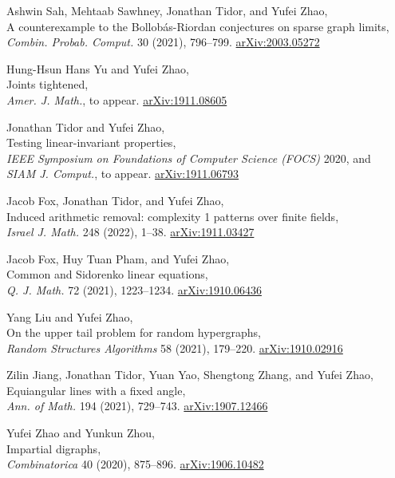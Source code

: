 \documentclass[11pt]{amsart}
\newcommand{\arXiv}[1]{\href{http://arxiv.org/abs/#1}{\color{black!50}\footnotesize\ttfamily  arXiv:#1}}
\renewcommand{\j}[1]{{\frenchspacing\itshape #1}}
\begin{document}
\begin{etaremune}[leftmargin=0.3in,itemsep=4pt,topsep=0pt,partopsep=0pt,parsep=0pt]
\item Ashwin Sah, Mehtaab Sawhney, Jonathan Tidor, and Yufei Zhao, \\
	 A counterexample to the Bollob\'as-Riordan conjectures on sparse graph limits, \\
	 \j{Combin. Probab. Comput.} 30 (2021), 796--799. \arXiv{2003.05272} 

\item Hung-Hsun Hans Yu and Yufei Zhao, \\
	Joints tightened, \\
	\j{Amer. J. Math.}, to appear. 
	\arXiv{1911.08605}

\item Jonathan Tidor and Yufei Zhao, \\
	Testing linear-invariant properties, \\
	\j{IEEE Symposium on Foundations of Computer Science (FOCS)} 2020, and \\
	\j{SIAM J. Comput.}, to appear. \arXiv{1911.06793}

\item Jacob Fox, Jonathan Tidor, and Yufei Zhao, \\
	Induced arithmetic removal: complexity 1 patterns over finite fields, \\
	\j{Israel J. Math.} 248 (2022), 1--38. \arXiv{1911.03427}

\item Jacob Fox, Huy Tuan Pham, and Yufei Zhao, \\
	Common and Sidorenko linear equations, \\
	\j{Q. J. Math.}  72 (2021), 1223--1234. \arXiv{1910.06436}

\item Yang Liu and Yufei Zhao, \\
	 On the upper tail problem for random hypergraphs, \\
	 \j{Random Structures Algorithms} 58 (2021), 179--220.
	  \arXiv{1910.02916}

\item Zilin Jiang, Jonathan Tidor, Yuan Yao, Shengtong Zhang, and Yufei Zhao, \\
	  Equiangular lines with a fixed angle, \\
      \j{Ann. of Math.} 194 (2021), 729--743. \arXiv{1907.12466}

\item Yufei Zhao and Yunkun Zhou, \\
	  Impartial digraphs, \\
	  \j{Combinatorica} 40 (2020), 875--896. \arXiv{1906.10482}


\end{etaremune}
\end{document}
